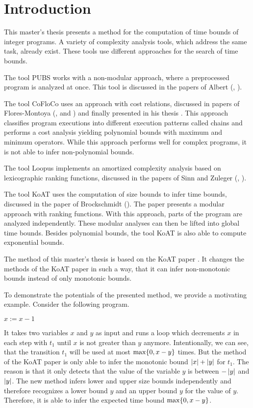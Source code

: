 \section{Introduction}

This master's thesis presents a method for the computation of time bounds of integer programs.
A variety of complexity analysis tools, which address the same task, already exist.
These tools use different approaches for the search of time bounds.

The tool PUBS works with a non-modular approach, where a preprocessed program is analyzed at once.
This tool is discussed in the papers of Albert (\cite{pubs1}, \cite{pubs2}).

The tool CoFloCo uses an approach with cost relations, discussed in papers of Flores-Montoya (\cite{cofloco1}, \cite{cofloco2} and \cite{cofloco4}) and finally presented in his thesis \cite{cofloco3}.
This approach classifies program executions into different execution patterns called chains and performs a cost analysis yielding polynomial bounds with maximum and minimum operators. 
While this approach performs well for complex programs, it is not able to infer non-polynomial bounds.

The tool Loopus implements an amortized complexity analysis based on lexicographic ranking functions, discussed in the papers of Sinn and Zuleger (\cite{loopus1}, \cite{loopus2}).

The tool KoAT uses the computation of size bounds to infer time bounds, discussed in the paper of Brockschmidt (\cite{koat}).
The paper presents a modular approach with ranking functions.
With this approach, parts of the program are analyzed independently.
These modular analyses can then be lifted into global time bounds.
Besides polynomial bounds, the tool KoAT \cite{koat} is also able to compute exponential bounds.

The method of this master's thesis is based on the KoAT paper \cite{koat}.
It changes the methods of the KoAT paper \cite{koat} in such a way, that it can infer non-monotonic bounds instead of only monotonic bounds.

To demonstrate the potentials of the presented method, we provide a motivating example.
Consider the following program.

\begin{algorithmic}
    \State $x := x - 1$
  \EndWhile
\end{algorithmic}

It takes two variables $x$ and $y$ as input and runs a loop which decrements $x$ in each step with $t_1$ until $x$ is not greater than $y$ anymore.
Intentionally, we can see, that the transition $t_1$ will be used at most $\max \lbrace 0, x-y \rbrace$ times.
But the method of the KoAT paper \cite{koat} is only able to infer the monotonic bound $\left|x\right|+\left|y\right|$ for $t_1$.
The reason is that it only detects that the value of the variable $y$ is between $-\left|y\right|$ and $\left|y\right|$.
The new method infers lower and upper size bounds independently and therefore recognizes a lower bound $y$ and an upper bound $y$ for the value of $y$.
Therefore, it is able to infer the expected time bound $\max \lbrace 0, x-y \rbrace$.

